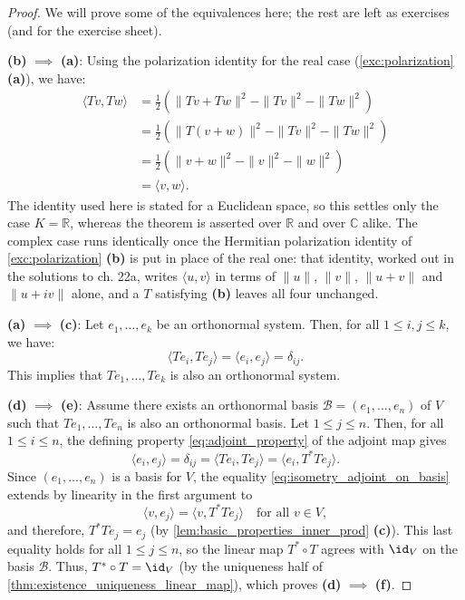 \begin{proof}
We will prove some of the equivalences here; the rest are left as exercises (and for the exercise sheet).

\textbf{(b)} $\implies$ \textbf{(a)}: Using the polarization identity for the real case (\cref{exc:polarization} \textbf{(a)}), we have:
\begin{align*}
    \langle Tv, Tw \rangle &= \frac{1}{2} \left( \|Tv + Tw\|^2 - \|Tv\|^2 - \|Tw\|^2 \right) \\
    &= \frac{1}{2} \left( \|T(v + w)\|^2 - \|Tv\|^2 - \|Tw\|^2 \right) \\
    &= \frac{1}{2} \left( \|v + w\|^2 - \|v\|^2 - \|w\|^2 \right) \\
    &= \langle v, w \rangle.
\end{align*}
The identity used here is stated for a Euclidean space, so this settles only the case $K = \mathbb{R}$, whereas the theorem is asserted over $\mathbb{R}$ and over $\mathbb{C}$ alike. The complex case runs identically once the Hermitian polarization identity of \cref{exc:polarization} \textbf{(b)} is put in place of the real one: that identity, worked out in the solutions to ch. 22a, writes $\langle u, v \rangle$ in terms of $\|u\|$, $\|v\|$, $\|u+v\|$ and $\|u+iv\|$ alone, and a $T$ satisfying \textbf{(b)} leaves all four unchanged.

\textbf{(a)} $\implies$ \textbf{(c)}: Let $e_1, \dots, e_k$ be an orthonormal system. Then, for all $1 \leq i, j \leq k$, we have:
\[ \langle Te_i, Te_j \rangle = \langle e_i, e_j \rangle = \delta_{ij}. \]
This implies that $Te_1, \dots, Te_k$ is also an orthonormal system.

\textbf{(d)} $\implies$ \textbf{(e)}: Assume there exists an orthonormal basis $\mathcal{B} = (e_1, \dots, e_n)$ of $V$ such that $Te_1, \dots, Te_n$ is also an orthonormal basis. Let $1 \leq j \leq n$. Then, for all $1 \leq i \leq n$, the defining property \eqref{eq:adjoint_property} of the adjoint map gives
\begin{equation}
\label{eq:isometry_adjoint_on_basis}
    \langle e_i, e_j \rangle = \delta_{ij} = \langle Te_i, Te_j \rangle = \langle e_i, T^*Te_j \rangle.
\end{equation}
Since $(e_1, \dots, e_n)$ is a basis for $V$, the equality \eqref{eq:isometry_adjoint_on_basis} extends by linearity in the first argument to
\[ \langle v, e_j \rangle = \langle v, T^*Te_j \rangle \quad \text{for all } v \in V, \]
and therefore, $T^*Te_j = e_j$ (by \cref{lem:basic_properties_inner_prod} \textbf{(c)}). This last equality holds for all $1 \leq j \leq n$, so the linear map $T^* \circ T$ agrees with $\id_V$ on the basis $\mathcal{B}$. Thus, $T^* \circ T = \id_V$ (by the uniqueness half of \cref{thm:existence_uniqueness_linear_map}), which proves \textbf{(d)} $\implies$ \textbf{(f)}.


\end{proof}
